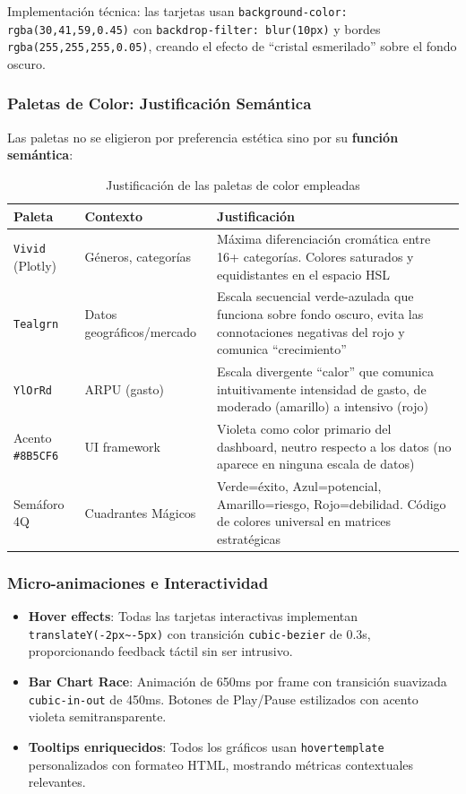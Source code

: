 \documentclass[11pt,a4paper]{article}
\begin{document}
Implementación técnica: las tarjetas usan \texttt{background-color: rgba(30,41,59,0.45)} con \texttt{backdrop-filter: blur(10px)} y bordes \texttt{rgba(255,255,255,0.05)}, creando el efecto de ``cristal esmerilado'' sobre el fondo oscuro.

\subsubsection{Paletas de Color: Justificación Semántica}

Las paletas no se eligieron por preferencia estética sino por su \textbf{función semántica}:

\begin{table}[H]
\centering
\caption{Justificación de las paletas de color empleadas}
\begin{tabularx}{\textwidth}{l l X}
\toprule
Paleta & Contexto & Justificación \\
\midrule
\texttt{Vivid} (Plotly) & Géneros, categorías & Máxima diferenciación cromática entre 16+ categorías. Colores saturados y equidistantes en el espacio HSL \\
\texttt{Tealgrn} & Datos geográficos/mercado & Escala secuencial verde-azulada que funciona sobre fondo oscuro, evita las connotaciones negativas del rojo y comunica ``crecimiento'' \\
\texttt{YlOrRd} & ARPU (gasto) & Escala divergente ``calor'' que comunica intuitivamente intensidad de gasto, de moderado (amarillo) a intensivo (rojo) \\
Acento \texttt{\#8B5CF6} & UI framework & Violeta como color primario del dashboard, neutro respecto a los datos (no aparece en ninguna escala de datos) \\
Semáforo 4Q & Cuadrantes Mágicos & Verde=éxito, Azul=potencial, Amarillo=riesgo, Rojo=debilidad. Código de colores universal en matrices estratégicas \\
\bottomrule
\end{tabularx}
\end{table}

\subsubsection{Micro-animaciones e Interactividad}

\begin{itemize}
  \item \textbf{Hover effects}: Todas las tarjetas interactivas implementan \texttt{translateY(-2px\textasciitilde-5px)} con transición \texttt{cubic-bezier} de 0.3s, proporcionando feedback táctil sin ser intrusivo.
  \item \textbf{Bar Chart Race}: Animación de 650ms por frame con transición suavizada \texttt{cubic-in-out} de 450ms. Botones de Play/Pause estilizados con acento violeta semitransparente.
  \item \textbf{Tooltips enriquecidos}: Todos los gráficos usan \texttt{hovertemplate} personalizados con formateo HTML, mostrando métricas contextuales relevantes.
\end{itemize}
\end{document}

